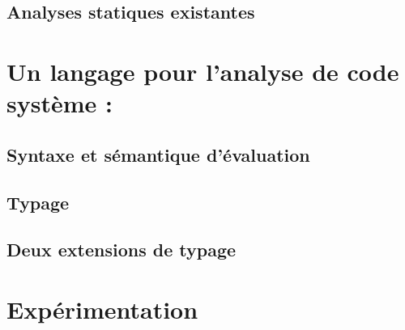\documentclass[a4paper,11pt]{memoir}
\begin{document}
%

\chapter{Analyses statiques existantes}

\label{cha:etatdelart}





\part{Un langage pour l'analyse de code système : \langname}
\label{part:lang}


\chapter{Syntaxe et sémantique d'évaluation}

\label{cha:lang}


\chapter{Typage}

\label{cha:typbase}



%

\chapter{Deux extensions de typage}

\label{cha:qualifs}



%

\label{cha:ccl2}



\part{Expérimentation}
\label{part:xp}
\end{document}
